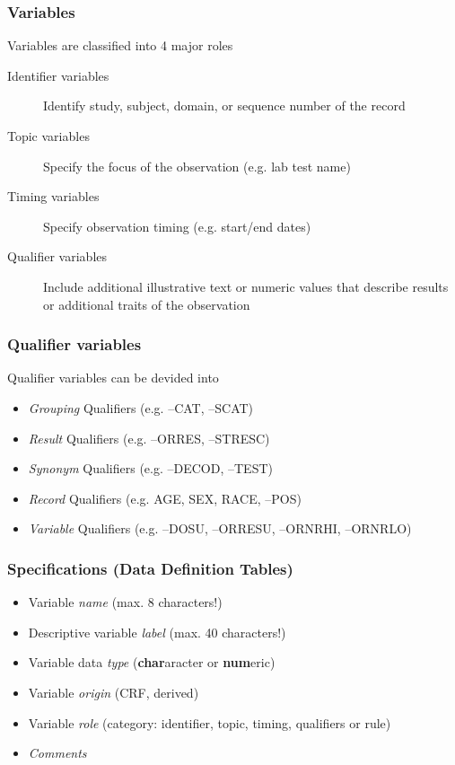 \documentclass{beamer}
\begin{document}
\begin{frame}
  \frametitle{Variables}
	Variables are classified into 4 major roles
  \begin{description}
		\item [Identifier variables] Identify study, subject, domain, or sequence number of the record
		\item [Topic variables] Specify the focus of the observation (e.g. lab test name)
		\item [Timing variables] Specify observation timing (e.g. start/end dates)
		\item [Qualifier variables] Include additional illustrative text or numeric values that describe results or 
					additional traits of the observation
  \end{description}
\end{frame}

\begin{frame}
  \frametitle{Qualifier variables}
  	Qualifier variables can be devided into
  	\begin{itemize}
		\item \emph{Grouping} Qualifiers (e.g. --CAT, --SCAT)
		\item \emph{Result} Qualifiers (e.g. --ORRES, --STRESC)
		\item \emph{Synonym} Qualifiers (e.g. --DECOD, --TEST)
		\item \emph{Record} Qualifiers (e.g. AGE, SEX, RACE, --POS)
		\item \emph{Variable} Qualifiers (e.g. --DOSU, --ORRESU, --ORNRHI, --ORNRLO)
  	\end{itemize}
\end{frame}

\begin{frame}
  \frametitle{Specifications (Data Definition Tables)}
  \begin{itemize}
		\item Variable \emph{name} (max. 8 characters!)
		\item Descriptive variable \emph{label} (max. 40 characters!)
		\item Variable data \emph{type} (\textbf{char}aracter or \textbf{num}eric)
		\item Variable \emph{origin} (CRF, derived)
		\item Variable \emph{role} (category: identifier, topic, timing, qualifiers or rule)
		\item \emph{Comments}
  \end{itemize}
\end{frame}
\end{document}
